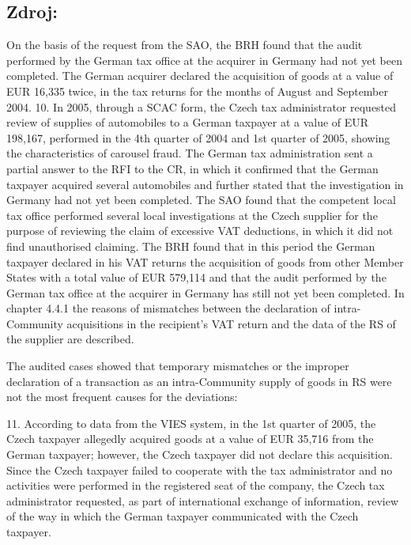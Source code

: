 \documentclass[10pt]{article}
\begin{document}
\subsection*{Zdroj:}

On the basis of the request from the SAO, the BRH found that the audit performed by the German tax office at the acquirer in Germany had not yet been completed.
The German acquirer declared the acquisition of goods at a value of EUR 16,335 twice, in the tax returns for the months of August and September 2004.
10.
In 2005, through a SCAC form, the Czech tax administrator requested review of supplies of automobiles to a German taxpayer at a value of EUR 198,167, performed in the 4th quarter of 2004 and 1st quarter of 2005, showing the characteristics of carousel fraud.
The German tax administration sent a partial answer to the RFI to the CR, in which it confirmed that the German taxpayer acquired several automobiles and further stated that the investigation in Germany had not yet been completed.
The SAO found that the competent local tax office performed several local investigations at the Czech supplier for the purpose of reviewing the claim of excessive VAT deductions, in which it did not find unauthorised claiming.
The BRH found that in this period the German taxpayer declared in his VAT returns the acquisition of goods from other Member States with a total value of EUR 579,114 and that the audit performed by the German tax office at the acquirer in Germany has still not yet been completed.
In chapter 4.4.1 the reasons of mismatches between the declaration of intra-Community acquisitions in the recipient’s VAT return and the data of the RS of the supplier are described.


The audited cases showed that temporary mismatches or the improper declaration of a transaction as an intra-Community supply of goods in RS were not the most frequent causes for the deviations:

11.
According to data from the VIES system, in the 1st quarter of 2005, the Czech taxpayer allegedly acquired goods at a value of EUR 35,716 from the German taxpayer; however, the Czech taxpayer did not declare this acquisition.
Since the Czech taxpayer failed to cooperate with the tax administrator and no activities were performed in the registered seat of the company, the Czech tax administrator requested, as part of international exchange of information, review of the way in which the German taxpayer communicated with the Czech taxpayer.


\pagebreak
\end{document}
